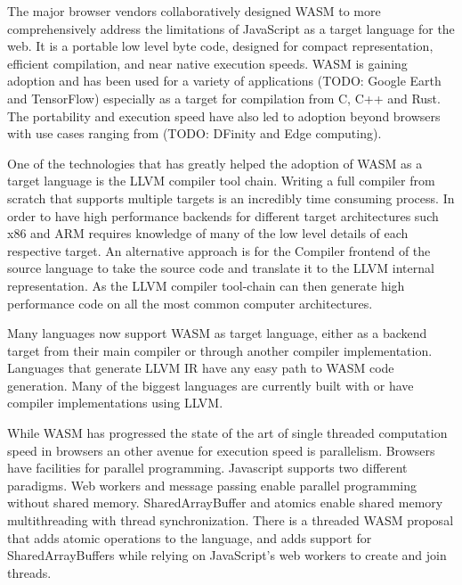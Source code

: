 \documentclass[11pt]{book}
\begin{document}
The major browser vendors collaboratively designed WASM to more comprehensively address the limitations of JavaScript as a target language for the web. It is a portable low level byte code, designed for compact representation, efficient compilation, and near native execution speeds. WASM is gaining adoption and has been used for a variety of applications (TODO: Google Earth and TensorFlow) especially as a target for compilation from C, C++ and Rust. The portability and execution speed have also led to adoption beyond browsers with use cases ranging from (TODO: DFinity and Edge computing). 

One of the technologies that has greatly helped the adoption of WASM as a target language is the LLVM compiler tool chain. Writing a full compiler from scratch that supports multiple targets is an incredibly time consuming process. In order to have high performance backends for different target architectures such x86 and ARM requires knowledge of many of the low level details of each respective target. An alternative approach is for the Compiler frontend of the source language to take the source code and translate it to the LLVM internal representation. As the LLVM compiler tool-chain can then generate high performance code on all the most common computer architectures. 


Many languages now support WASM as target language, either as a backend target from their main compiler or through another compiler implementation. Languages that generate LLVM IR have any easy path to WASM code generation. Many of the biggest languages are currently built with or have compiler implementations using LLVM.

While WASM has progressed the state of the art of single threaded computation speed in browsers an other avenue for execution speed is parallelism. Browsers have facilities for parallel programming. Javascript supports two different paradigms. Web  workers  and  message  passing  enable  parallel  programming  without  shared  memory. SharedArrayBuffer and atomics enable shared memory multithreading with thread synchronization.  There is a threaded WASM proposal that adds atomic operations to the language, and adds support for SharedArrayBuffers while relying on JavaScript’s web workers to create and join threads. 
\end{document}
